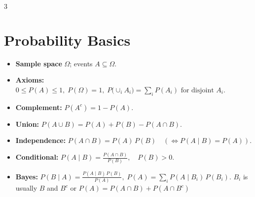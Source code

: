 \documentclass[10pt,landscape]{article}
\begin{document}
\begin{multicols}{3}

\section{Probability Basics}
\begin{itemize}
  \item \textbf{Sample space} $\Omega$; events $A\subseteq\Omega$.
  \item \textbf{Axioms:} $\displaystyle 0 \le P(A) \le 1,\; P(\Omega)=1,\; P\bigl(\cup_{i}A_i\bigr)=\sum_i P(A_i)\text{ for disjoint }A_i.$
  \item \textbf{Complement:} $\displaystyle P(A^c) = 1 - P(A).$
  \item \textbf{Union:} $\displaystyle P(A \cup B) = P(A)+P(B)-P(A\cap B).$
  \item \textbf{Independence:} $\displaystyle P(A \cap B) = P(A)\,P(B)\quad(\Leftrightarrow P(A\mid B)=P(A)).$
  \item \textbf{Conditional:} $\displaystyle P(A\mid B)=\frac{P(A\cap B)}{P(B)},\quad P(B)>0.$
  \item \textbf{Bayes:} $\displaystyle P(B\mid A)=\frac{P(A\mid B)\,P(B)}{P(A)},\; P(A)=\sum_iP(A\mid B_i)\,P(B_i).$
\noindent $B_i$ is usually $B$ and $B^c$ or $P(A) = P(A \cap B) + P(A \cap B^c)$
\end{itemize}


\end{multicols}
\end{document}

